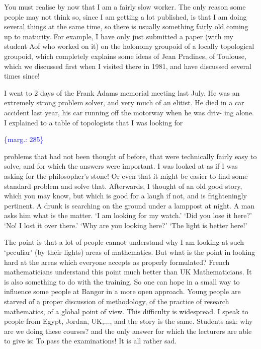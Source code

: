 \documentclass[11pt]{article}
\newcommand{\scanpage}[1]{\par\bigskip\noindent{\small\sffamily[scan #1]}\par}
\newcommand{\mspage}[1]{{\small\sffamily[p.\,#1]}}
\newcommand{\margin}[1]{\textcolor{blue}{\{\textsf{marg.:} #1\}}}
\begin{document}
You must realise by now that I am a fairly slow worker. The only
reason some people may not think so, since I am getting a lot published, is
that I am doing several things at the same time, so there is usually
something fairly old coming up to maturity. For example, I have only just
submitted a paper (with my student Aof who worked on it) on the holonomy
groupoid of a locally topological groupoid, which completely explains some
ideas of Jean Pradines, of Toulouse, which we discussed first when I visited
there in 1981, and have discussed several times since!

I went to 2 days of the Frank Adams memorial meeting last July. He was
an extremely strong problem solver, and very much of an elitist. He died in
a car accident last year, his car running off the motorway when he was driv-%
ing alone. I explained to a table of topologists that I was looking for

\mspage{4}

\margin{285}

\clearpage
\scanpage{119/286}
problems that had not been thought of before, that were technically fairly
easy to solve, and for which the answers were important. I was looked at as
if I was asking for the philosopher's stone! Or even that it might be
easier to find some standard problem and solve that. Afterwards, I thought
of an old good story, which you may know, but which is good for a laugh if
not, and is frighteningly pertinent. A drunk is searching on the ground
under a lamppost at night. A man asks him what is the matter. `I am
looking for my watch.' `Did you lose it here?' `No! I lost it over
there.' `Why are you looking here?' `The light is better here!'

The point is that a lot of people cannot understand why I am looking at
such `peculiar' (by their lights) areas of mathematics. But what is the
point in looking hard at the areas which everyone accepts as properly
formulated? French mathematicians understand this point much better than UK
Mathematicians. It is also something to do with the training. So one can
hope in a small way to influence some people at Bangor in a more open
approach. Young people are starved of a proper discussion of methodology,
of the practice of research mathematics, of a global point of view. This
difficulty is widespread. I speak to people from Egypt, Jordan, UK,..., and
the story is the same. Students ask: why are we doing these courses? and
the only answer for which the lecturers are able to give is: To pass the
examinations! It is all rather sad.
\end{document}
